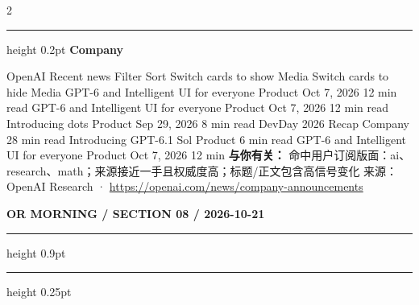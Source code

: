 \documentclass[10.5pt]{ctexart}
\begin{document}
\begin{multicols}{2}
\vspace{2mm}
\hrule height 0.2pt
\vspace{2mm}
{\large\bfseries Company}\par
OpenAI Recent news Filter Sort Switch cards to show Media Switch cards to hide Media GPT-6 and Intelligent UI for everyone Product Oct 7, 2026 12 min read GPT-6 and Intelligent UI for everyone Product Oct 7, 2026 12 min read Introducing dots Product Sep 29, 2026 8 min read DevDay 2026 Recap Company 28 min read Introducing GPT-6.1 Sol Product 6 min read GPT-6 and Intelligent UI for everyone Product Oct 7, 2026 12 min 
\textbf{与你有关：} 命中用户订阅版面：ai、research、math；来源接近一手且权威度高；标题/正文包含高信号变化
{\footnotesize\color{ormuted} 来源：OpenAI Research · \url{https://openai.com/news/company-announcements}}
\end{multicols}
\newpage
{\small\bfseries OR MORNING / SECTION 08 / 2026-10-21}
\vspace{2mm}
\hrule height 0.9pt
\vspace{1.5mm}
\hrule height 0.25pt
\vspace{4mm}
\end{document}
